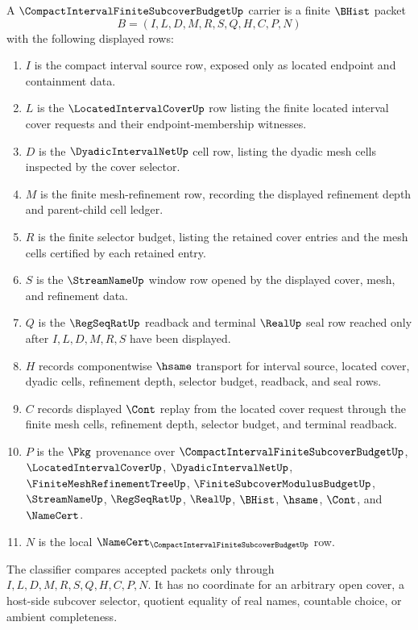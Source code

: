 \begin{definition}
\label{def:compact-interval-located-cover-selector}
A $\CompactIntervalFiniteSubcoverBudgetUp$ carrier is a finite $\BHist$ packet
$$
B=(I,L,D,M,R,S,Q,H,C,P,N)
$$
with the following displayed rows:
\begin{enumerate}
\item $I$ is the compact interval source row, exposed only as located endpoint and containment data.
\item $L$ is the $\LocatedIntervalCoverUp$ row listing the finite located interval cover requests and their endpoint-membership witnesses.
\item $D$ is the $\DyadicIntervalNetUp$ cell row, listing the dyadic mesh cells inspected by the cover selector.
\item $M$ is the finite mesh-refinement row, recording the displayed refinement depth and parent-child cell ledger.
\item $R$ is the finite selector budget, listing the retained cover entries and the mesh cells certified by each retained entry.
\item $S$ is the $\StreamNameUp$ window row opened by the displayed cover, mesh, and refinement data.
\item $Q$ is the $\RegSeqRatUp$ readback and terminal $\RealUp$ seal row reached only after $I,L,D,M,R,S$ have been displayed.
\item $H$ records componentwise $\hsame$ transport for interval source, located cover, dyadic cells, refinement depth, selector budget, readback, and seal rows.
\item $C$ records displayed $\Cont$ replay from the located cover request through the finite mesh cells, refinement depth, selector budget, and terminal readback.
\item $P$ is the $\Pkg$ provenance over $\CompactIntervalFiniteSubcoverBudgetUp$, $\LocatedIntervalCoverUp$, $\DyadicIntervalNetUp$, $\FiniteMeshRefinementTreeUp$, $\FiniteSubcoverModulusBudgetUp$, $\StreamNameUp$, $\RegSeqRatUp$, $\RealUp$, $\BHist$, $\hsame$, $\Cont$, and $\NameCert$.
\item $N$ is the local $\NameCert_{\CompactIntervalFiniteSubcoverBudgetUp}$ row.
\end{enumerate}
The classifier compares accepted packets only through $I,L,D,M,R,S,Q,H,C,P,N$. It has no coordinate for an arbitrary open cover, a host-side subcover selector, quotient equality of real names, countable choice, or ambient completeness.
\end{definition}

